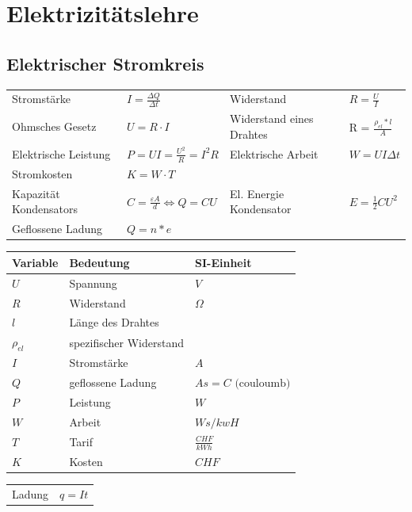 \section{Elektrizitätslehre}
\subsection{Elektrischer Stromkreis}
\begin{tabbing}
	\begin{tabu} to \linewidth {l X l X}
		\toprule
		Stromstärke & $I = \frac{\Delta Q}{\Delta t}$ & 
		Widerstand & $R = \frac{U}{I}$ \\
		Ohmsches Gesetz & $U = R \cdot I$ & 
		Widerstand eines Drahtes & R = $\frac{\rho_{el}*l}{A}$ \\
		Elektrische Leistung & $P = UI = \frac{U^2}{R} = I^2 R$ & 
		Elektrische Arbeit & $W = UI\Delta t$ \\
		Stromkosten & $K = W \cdot T$ & \\
		Kapazität Kondensators & $C= \frac{\varepsilon A}{d} \Leftrightarrow Q = CU$ &
		El. Energie Kondensator & $E=\frac{1}{2} CU^2$\\
		Geflossene Ladung & $Q = n * e$ & & \\
	\end{tabu}
\end{tabbing}


\begin{tabbing}
	\begin{tabu} to \linewidth {l X l}
		Variable & Bedeutung & SI-Einheit \\
		\midrule
		$U$ & Spannung& $V$ \\
		$R$ & Widerstand & $\Omega$ \\
		$l$ & Länge des Drahtes & \\
		$\rho_{el}$ & spezifischer Widerstand & \\
		$I$ & Stromstärke & $A$ \\
		$Q$ & geflossene Ladung & $As = C \text{ (couloumb)}$ \\
		$P$ & Leistung & $W$ \\	
		$W$ & Arbeit & $Ws / kwH$ \\
		$T$ & Tarif & $\frac{CHF}{kWh}$ \\
		$K$ & Kosten & $CHF$ \\
		\bottomrule
	\end{tabu}
\end{tabbing}

\begin{tabular}{|l|l|}
Ladung & $q = I t$
\end{tabular}

